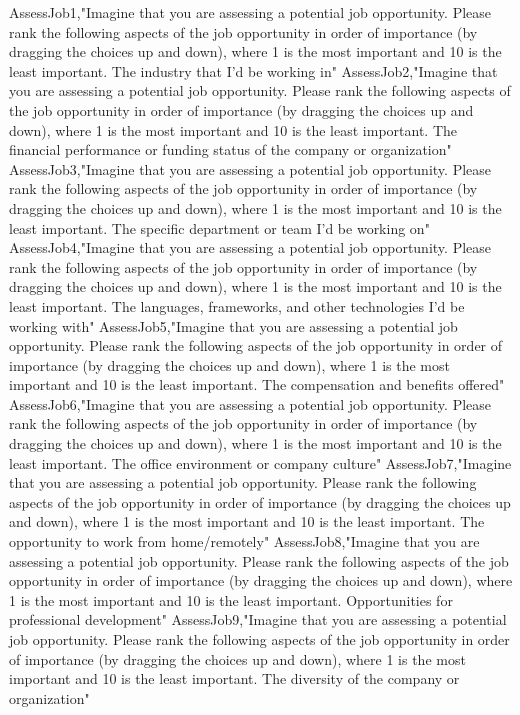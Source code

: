 \begin{appendices}
AssessJob1,"Imagine that you are assessing a potential job opportunity. Please rank the following aspects of the job opportunity in order of importance (by dragging the choices up and down), where 1 is the most important and 10 is the least important. The industry that I'd be working in"
AssessJob2,"Imagine that you are assessing a potential job opportunity. Please rank the following aspects of the job opportunity in order of importance (by dragging the choices up and down), where 1 is the most important and 10 is the least important. The financial performance or funding status of the company or organization"
AssessJob3,"Imagine that you are assessing a potential job opportunity. Please rank the following aspects of the job opportunity in order of importance (by dragging the choices up and down), where 1 is the most important and 10 is the least important. The specific department or team I'd be working on"
AssessJob4,"Imagine that you are assessing a potential job opportunity. Please rank the following aspects of the job opportunity in order of importance (by dragging the choices up and down), where 1 is the most important and 10 is the least important. The languages, frameworks, and other technologies I'd be working with"
AssessJob5,"Imagine that you are assessing a potential job opportunity. Please rank the following aspects of the job opportunity in order of importance (by dragging the choices up and down), where 1 is the most important and 10 is the least important. The compensation and benefits offered"
AssessJob6,"Imagine that you are assessing a potential job opportunity. Please rank the following aspects of the job opportunity in order of importance (by dragging the choices up and down), where 1 is the most important and 10 is the least important. The office environment or company culture"
AssessJob7,"Imagine that you are assessing a potential job opportunity. Please rank the following aspects of the job opportunity in order of importance (by dragging the choices up and down), where 1 is the most important and 10 is the least important. The opportunity to work from home/remotely"
AssessJob8,"Imagine that you are assessing a potential job opportunity. Please rank the following aspects of the job opportunity in order of importance (by dragging the choices up and down), where 1 is the most important and 10 is the least important. Opportunities for professional development"
AssessJob9,"Imagine that you are assessing a potential job opportunity. Please rank the following aspects of the job opportunity in order of importance (by dragging the choices up and down), where 1 is the most important and 10 is the least important. The diversity of the company or organization"

\end{appendices}
